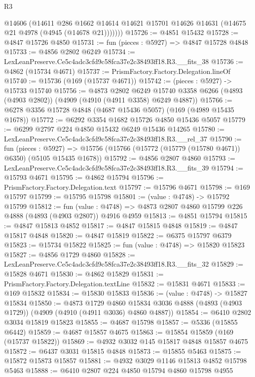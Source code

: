 \begin{lexlean}{R3}
\begin{coremodule}
          @14606
          (@14611
            @286
            @1662
            @14614
            @14621
            @15701
            @14626
            @14631
            (@14675 @21 @4978 (@4945 (@14678 @21)))))))
@15726 := @4851 @15432
@15728 := @4847 @15726 @4850
@15731 := fun (pieces : @5927) => @4847 @15728 @4848
@15733 := @4856 @2802 @6249
@15734 := LexLeanPreserve.Ce5c4adc3cfd9c58fca37e2c38493ff18.R3.__fits_38
@15736 := @4862 (@15734 @4671)
@15737 := PrismFactory.Factory.Delegation.lineOf
@15740 := @15736 (@169 (@15737 @4671))
@15742 := (pieces : @5927) -> @15733 @15740
@15756 := @4873
    @2802
    @6249
    @15740
    @3358
    @6266
    (@4893 (@4903 @2802))
    (@4909 (@4910 (@4911 @3358) @6249 @4887))
@15766 := @6278 @3356 @15728 @4848 (@4687 @15436 @5057) (@169 (@4989 @15435 @1678))
@15772 := @6292 @3354 @1682 @15726 @4850 @15436 @5057
@15779 := @6299 @2797 @224 @4850 @15432 @6249 @15436 @14265
@15780 := LexLeanPreserve.Ce5c4adc3cfd9c58fca37e2c38493ff18.R3.__rel_37
@15790 := fun (pieces : @5927) =>
  @15756 (@15766 (@15772 (@15779 (@15780 @4671)) @6350) (@5105 @15435 @1678))
@15792 := @4856 @2807 @4860
@15793 := LexLeanPreserve.Ce5c4adc3cfd9c58fca37e2c38493ff18.R3.__fits_39
@15794 := @15793 @4671
@15795 := @4862 @15794
@15796 := PrismFactory.Factory.Delegation.text
@15797 := @15796 @4671
@15798 := @169 @15797
@15799 := @15795 @15798
@15801 := (value : @4748) -> @15792 @15799
@15812 := fun (value : @4748) =>
  @4873 @2807 @4860 @15799 @226 @4888 (@4893 (@4903 @2807)) @4916 @4959
@15813 := @4851 @15794
@15815 := @4847 @15813 @4852
@15817 := @4847 @15815 @4848
@15819 := @4847 @15817 @4848
@15820 := @4847 @15819
@15822 := @6375 @15797 @6379
@15823 := @15734 @15822
@15825 := fun (value : @4748) => @15820 @15823
@15827 := @4856 @1729 @4860
@15828 := LexLeanPreserve.Ce5c4adc3cfd9c58fca37e2c38493ff18.R3.__fits_32
@15829 := @15828 @4671
@15830 := @4862 @15829
@15831 := PrismFactory.Factory.Delegation.textLine
@15832 := @15831 @4671
@15833 := @169 @15832
@15834 := @15830 @15833
@15836 := (value : @4748) -> @15827 @15834
@15850 := @4873
    @1729
    @4860
    @15834
    @3036
    @4888
    (@4893 (@4903 @1729))
    (@4909 (@4910 (@4911 @3036) @4860 @4887))
@15854 := @6410 @2802 @3034 @15819 @15823
@15855 := @4687 @15798
@15857 := @5336 (@15855 @6442)
@15859 := @4687 @15857 @4675
@15863 := @15854 @15859 (@169 (@15737 @15822))
@15869 := @4932 @3032 @145 @15817 @4848 @15857 @4675
@15872 := @6437 @3031 @15815 @4848
@15873 := @15855 @5463
@15875 := @15872 @15873 @15857
@15881 := @4932 @3029 @1146 @15813 @4852 @15798 @5463
@15888 := @6410 @2807 @224 @4850 @15794 @4860 @15798 @4955

\end{coremodule}
\end{lexlean}
